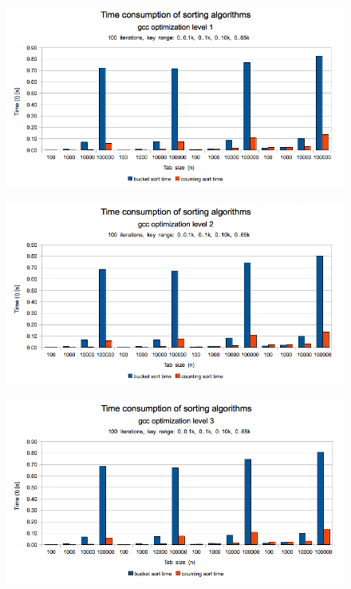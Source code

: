 \documentclass[12pt]{article}
\begin{document}
\begin{figure}[H]
    \centering
    \includegraphics[width=1\textwidth]{compare-gcc-opt1}
\end{figure}

\begin{figure}[H]
    \centering
    \includegraphics[width=1\textwidth]{compare-gcc-opt2}
\end{figure}

\begin{figure}[H]
    \centering
    \includegraphics[width=1\textwidth]{compare-gcc-opt3}
\end{figure}
\end{document}
